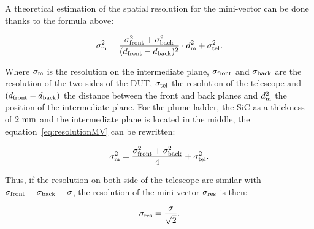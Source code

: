     A theoretical estimation of the spatial resolution for the mini-vector can be done thanks to the formula above:

    \begin{equation}
      \sigma_{\rm{m}}^2 = \frac{\sigma_{\rm{front}}^2 + \sigma_{\rm{back}}^2}{(d_{\rm{front}} - d_{\rm{back}})^2} \cdot d_{\rm{m}}^2 + \sigma_{\rm{tel}}^2.
      \label{eq:resolutionMV}
    \end{equation}

    Where $\sigma_{\rm{m}}$ is the resolution on the intermediate plane, $\sigma_{\rm{front}}$ and $\sigma_{\rm{back}}$ are the resolution of the two sides of the \gls{DUT}, $\sigma_{\rm{tel}}$ the resolution of the telescope and $(d_{\rm{front}} - d_{\rm{back}})$ the distance between the front and back planes and $d_{\rm{m}}^2$ the position of the intermediate plane.
    For the plume ladder, the \gls{SiC} as a thickness of $2~\rm{mm}$ and the intermediate plane is located in the middle, the equation~\ref{eq:resolutionMV} can be rewritten:

    \begin{equation}
      \sigma_{\rm{m}}^2 = \frac{\sigma_{\rm{front}}^2 + \sigma_{\rm{back}}^2}{4} + \sigma_{\rm{tel}}^2.
    \end{equation}

    Thus, if the resolution on both side of the telescope are similar with $\sigma_{\rm{front}} = \sigma_{\rm{back}} = \sigma$, the resolution of the mini-vector $\sigma_{\rm{res}}$ is then:

    \begin{equation}
      \sigma_{\rm{res}} = \frac{\sigma}{\sqrt{2}}.
    \end{equation}

